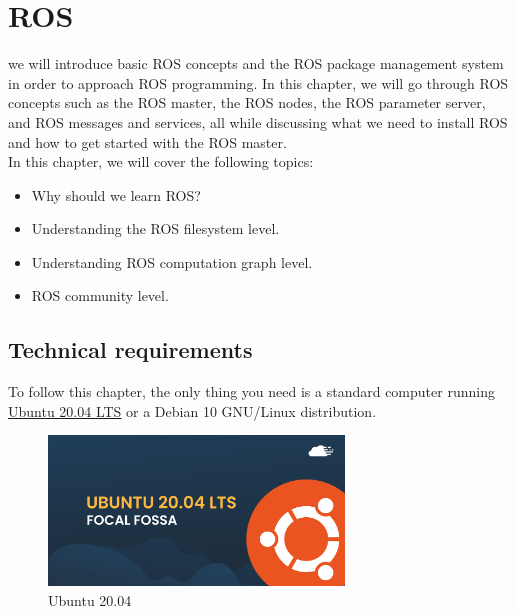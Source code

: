 \documentclass[../../main]{subfiles}
\begin{document}
\chapter{ROS}
we will introduce basic ROS concepts and the ROS package management system in order to approach ROS
programming. In this chapter, we will go through ROS concepts such
as the ROS master, the ROS nodes, the ROS parameter server, and ROS
messages and services, all while discussing what we need to install ROS
and how to get started with the ROS master.\\
In this chapter, we will cover the following topics:
\begin{itemize}
\item  Why should we learn ROS?
\item Understanding the ROS filesystem level.
\item Understanding ROS computation graph level.
\item ROS community level.
\end{itemize}
\section*{Technical requirements}
To follow this chapter, the only thing you need is a 
standard computer running \href{https://releases.ubuntu.com/20.04/}{Ubuntu 20.04 LTS} or a Debian 10 GNU/Linux 
distribution.
\begin{figure}
    \centering
    \includegraphics[width=0.7\textwidth]{img/ubuntu.png}
    \caption{Ubuntu 20.04}
\end{figure}
\newpage
\end{document}
